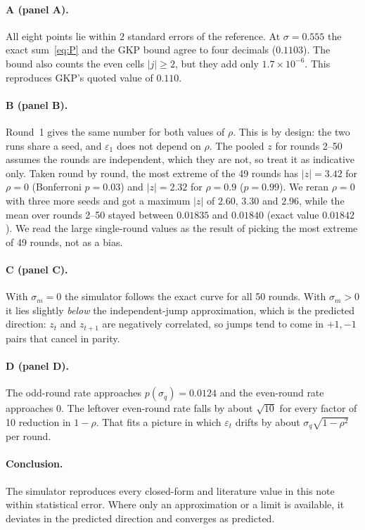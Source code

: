 \documentclass[11pt,letterpaper]{article}
\begin{document}
\paragraph{A (panel A).} All eight points lie within $2$ standard errors of the
reference. At $\sigma=0.555$ the exact sum~\eqref{eq:P} and the GKP bound
agree to four decimals ($0.1103$). The bound also counts the even cells
$|j|\ge2$, but they add only $1.7\times10^{-6}$. This reproduces GKP's quoted
value of $0.110$.

\paragraph{B (panel B).} Round~1 gives the same number for both values of
$\rho$. This is by design: the two runs share a seed, and $\varepsilon_1$ does
not depend on $\rho$. The pooled $z$ for rounds 2--50 assumes the rounds are
independent, which they are not, so treat it as indicative only. Taken round
by round, the most extreme of the 49 rounds has $|z|=3.42$ for $\rho=0$
(Bonferroni $p=0.03$) and $|z|=2.32$ for $\rho=0.9$ ($p=0.99$). We reran
$\rho=0$ with three more seeds and got a maximum $|z|$ of $2.60$, $3.30$ and
$2.96$, while the mean over rounds 2--50 stayed between $0.01835$ and
$0.01840$ (exact value $0.01842$). We read the large single-round values as
the result of picking the most extreme of 49 rounds, not as a bias.

\paragraph{C (panel C).} With $\sigma_m=0$ the simulator follows the exact
curve for all 50 rounds. With $\sigma_m>0$ it lies slightly \emph{below} the
independent-jump approximation, which is the predicted direction:
$z_t$ and $z_{t+1}$ are negatively correlated, so jumps tend to come in
$+1,-1$ pairs that cancel in parity.

\paragraph{D (panel D).} The odd-round rate approaches
$p(\sigma_q)=0.0124$ and the even-round rate approaches $0$. The leftover
even-round rate falls by about $\sqrt{10}$ for every factor of 10 reduction
in $1-\rho$. That fits a picture in which $\varepsilon_t$ drifts by about
$\sigma_q\sqrt{1-\rho^2}$ per round.

\paragraph{Conclusion.} The simulator reproduces every closed-form and
literature value in this note within statistical error. Where only an
approximation or a limit is available, it deviates in the predicted direction
and converges as predicted.
\end{document}
